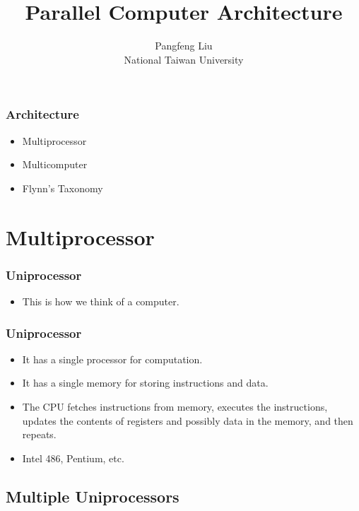 \documentclass{beamer}
\begin{document}
\begin{CJK}{UTF8}{bsmi}

\title{Parallel Computer Architecture}

\author{Pangfeng Liu \\ National Taiwan University}

\begin{frame}
\titlepage
\end{frame}


\begin{frame}
\frametitle{Architecture}
\begin{itemize}
\item Multiprocessor
\item Multicomputer
\item Flynn's Taxonomy
\end{itemize}
\end{frame}

\section{Multiprocessor}

\begin{frame}
\frametitle{Uniprocessor}
\centerline{}
\begin{itemize}
\item This is how we think of a computer.
\end{itemize}
\end{frame}

\begin{frame}
\frametitle{Uniprocessor}
\begin{itemize}
\item It has a single processor for computation.
\item It has a single memory for storing instructions and data.
\item The CPU fetches instructions from memory, executes the instructions, updates the contents of registers and possibly data in the memory, and then repeats.
\item Intel 486, Pentium, etc.
\end{itemize}
\end{frame}


\subsection{Multiple Uniprocessors}


\end{CJK}
\end{document}
